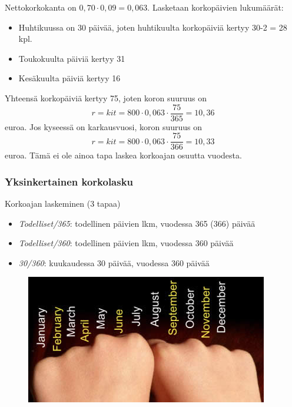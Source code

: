 \documentclass[]{beamer}
\begin{document}
\begin{frame}
    \begin{ratkaisu}
        Nettokorkokanta on \(0,70\cdot0,09 = 0,063\). Lasketaan korkopäivien lukumäärät:\pause
        \begin{itemize}
            \item Huhtikuussa on 30 päivää, joten huhtikuulta korkopäiviä kertyy 30-2 = 28 kpl.\pause
            \item Toukokuulta päiviä kertyy 31\pause
            \item Kesäkuulta päiviä kertyy 16
        \end{itemize}
        Yhteensä korkopäiviä kertyy 75, joten koron suuruus on\pause
        \[
            r = kit = 800\cdot 0,063\cdot \frac{75}{365} = 10,36
        \]
        euroa. \pause Jos kyseessä on karkausvuosi, koron suuruus on
        \[
            r = kit = 800\cdot 0,063\cdot \frac{75}{366} = 10,33
        \]
        euroa. \pause Tämä ei ole ainoa tapa laskea korkoajan osuutta vuodesta.
    \end{ratkaisu}
\end{frame}

\begin{frame}
    \frametitle{Yksinkertainen korkolasku}
    \begin{block}{Korkoajan laskeminen (3 tapaa)}
        \begin{itemize}
            \item \emph{Todelliset/365}: todellinen päivien lkm, vuodessa 365 (366) päivää
            \item \emph{Todelliset/360}: todellinen päivien lkm, vuodessa 360 päivää
            \item \emph{30/360}: kuukaudessa 30 päivää, vuodessa 360 päivää
        \end{itemize}
    \end{block}
    \begin{figure}
        \includegraphics[scale=0.7]{months}
    \end{figure}
\end{frame}
\end{document}
